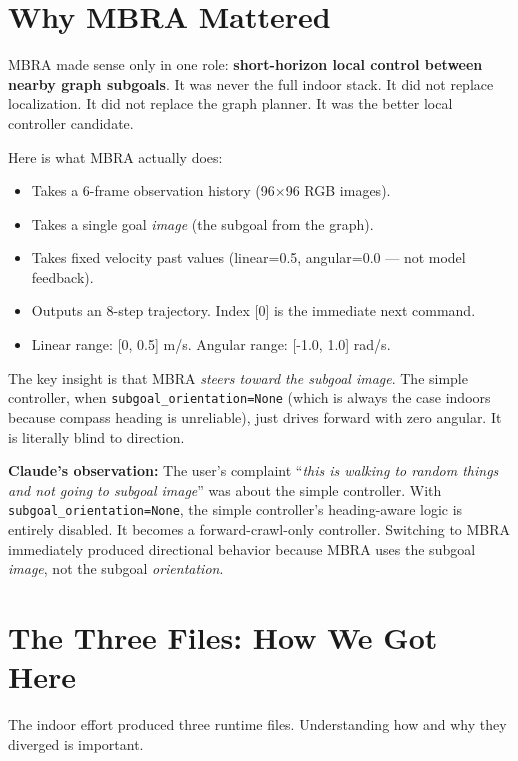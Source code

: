 \documentclass[11pt]{article}
\begin{document}
\section{Why MBRA Mattered}

MBRA made sense only in one role: \textbf{short-horizon local control between nearby graph subgoals}. It was never the full indoor stack. It did not replace localization. It did not replace the graph planner. It was the better local controller candidate.

Here is what MBRA actually does:
\begin{itemize}
\item Takes a 6-frame observation history (96$\times$96 RGB images).
\item Takes a single goal \emph{image} (the subgoal from the graph).
\item Takes fixed velocity past values (linear=0.5, angular=0.0 --- not model feedback).
\item Outputs an 8-step trajectory. Index [0] is the immediate next command.
\item Linear range: [0, 0.5] m/s. Angular range: [-1.0, 1.0] rad/s.
\end{itemize}

The key insight is that MBRA \emph{steers toward the subgoal image}. The simple controller, when \texttt{subgoal\_orientation=None} (which is always the case indoors because compass heading is unreliable), just drives forward with zero angular. It is literally blind to direction.

\textbf{Claude's observation:} The user's complaint ``\emph{this is walking to random things and not going to subgoal image}'' was about the simple controller. With \texttt{subgoal\_orientation=None}, the simple controller's heading-aware logic is entirely disabled. It becomes a forward-crawl-only controller. Switching to MBRA immediately produced directional behavior because MBRA uses the subgoal \emph{image}, not the subgoal \emph{orientation}.


\section{The Three Files: How We Got Here}

The indoor effort produced three runtime files. Understanding how and why they diverged is important.
\end{document}
